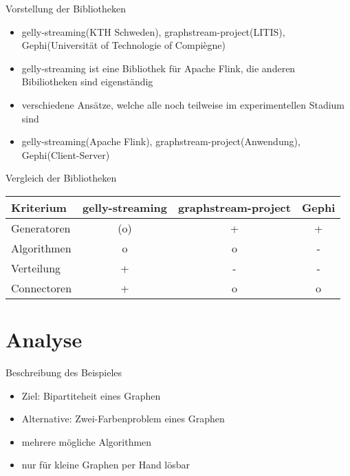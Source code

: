 \documentclass[a4paper, fontsize=11pt]{beamer}
\begin{document}
\begin{frame}{Vorstellung der Bibliotheken}
    \begin{itemize}
        \item gelly-streaming(KTH Schweden), graphstream-project(LITIS),
            Gephi(Universität of Technologie of Compiègne)
        \item gelly-streaming ist eine Bibliothek für Apache Flink, die anderen
            Bibiliotheken sind eigenständig
        \item verschiedene Ansätze, welche alle noch teilweise im experimentellen
            Stadium sind
        \item gelly-streaming(Apache Flink), graphstream-project(Anwendung),
            Gephi(Client-Server)
    \end{itemize}
\end{frame}

\begin{frame}{Vergleich der Bibliotheken}
    \begin{table}
        \begin{tabular}{l|c|c|c}
            Kriterium & gelly-streaming & graphstream-project & Gephi \\
            \hline
            Generatoren & (o) & + & + \\
            Algorithmen & o & o & - \\
            Verteilung & + & - & - \\
            Connectoren & + & o & o \\
        \end{tabular}
    \end{table}
\end{frame}

\section{Analyse}
\begin{frame}{Beschreibung des Beispieles}
    \begin{itemize}
        \item Ziel: Bipartiteheit eines Graphen
        \item Alternative: Zwei-Farbenproblem eines Graphen
        \item mehrere mögliche Algorithmen
        \item nur für kleine Graphen per Hand lösbar
    \end{itemize}
\end{frame}
\end{document}
